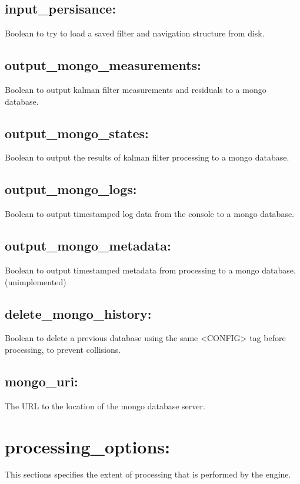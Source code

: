 \subsection{input\_persisance:}
Boolean to try to load a saved filter and navigation structure from disk.

\subsection{output\_mongo\_measurements:}
Boolean to output kalman filter measurements and residuals to a mongo database.

\subsection{output\_mongo\_states:}
Boolean to output the results of kalman filter processing to a mongo database.

\subsection{output\_mongo\_logs:}
Boolean to output timestamped log data from the console to a mongo database.

\subsection{output\_mongo\_metadata:}
Boolean to output timestamped metadata from processing to a mongo database. (unimplemented)

\subsection{delete\_mongo\_history:}
Boolean to delete a previous database using the same <CONFIG> tag before processing, to prevent collisions.

\subsection{mongo\_uri:}
The URL to the location of the mongo database server.




\section{processing\_options:}

This sections specifies the extent of processing that is performed by the engine.

